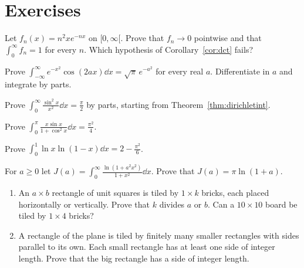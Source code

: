 \section{Exercises}

\begin{exercise}[$\star$]\label{ex:swapfail}
Let $f_n(x)=n^2xe^{-nx}$ on $[0,\infty[$. Prove that $f_n\to0$ pointwise and that $\int_0^\infty f_n=1$ for every $n$. Which hypothesis of Corollary~\ref{cor:dct} fails?
\end{exercise}

\begin{exercise}[$\star$]\label{ex:gausscos}
Prove $\int_{-\infty}^\infty e^{-x^2}\cos(2ax)\dd x=\sqrt\pi\,e^{-a^2}$ for every real $a$. Differentiate in $a$ and integrate by parts.
\end{exercise}

\begin{exercise}[$\star$]\label{ex:sin2}
Prove $\int_0^\infty\frac{\sin^2x}{x^2}\dd x=\frac\pi2$ by parts, starting from Theorem~\ref{thm:dirichletint}.
\end{exercise}

\begin{exercise}[$\star\star$]\label{ex:xsinx}
Prove $\int_0^\pi\frac{x\sin x}{1+\cos^2x}\dd x=\frac{\pi^2}4$.
\end{exercise}

\begin{exercise}[$\star\star$]\label{ex:loglog}
Prove $\int_0^1\ln x\ln(1-x)\dd x=2-\frac{\pi^2}6$.
\end{exercise}

\begin{exercise}[$\star\star$]\label{ex:arctanparam}
For $a\ge0$ let
$J(a)=\int_0^\infty\frac{\ln(1+a^2x^2)}{1+x^2}\dd x$. Prove that $J(a)=\pi\ln(1+a)$.
\end{exercise}

\begin{exercise}[$\star\star$]\label{pb:bricks}
\begin{enumerate}[label=(\alph*)]
\item An $a\times b$ rectangle of unit squares is tiled by $1\times k$ bricks, each placed horizontally or vertically.
Prove that $k$ divides $a$ or $b$. Can a $10\times10$ board be tiled by $1\times4$ bricks?
\item A rectangle of the plane is tiled by finitely many smaller rectangles with sides parallel to its own. Each small
rectangle has at least one side of integer length. Prove that the big rectangle has a side of integer length.
\end{enumerate}
\end{exercise}

